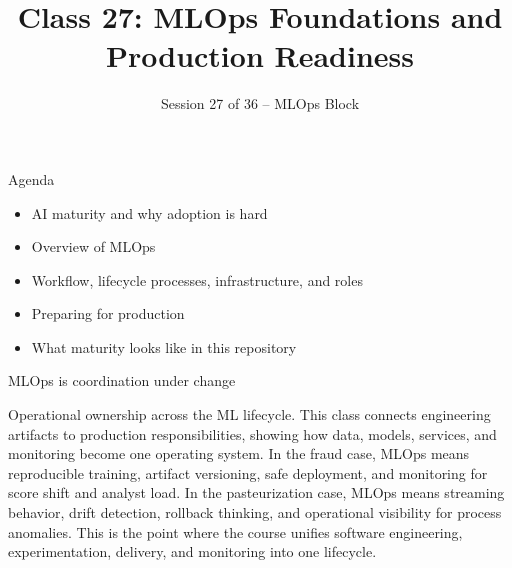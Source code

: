 

\title{Class 27: MLOps Foundations and Production Readiness}
\subtitle{Session 27 of 36 -- MLOps Block}
\author{\coursename}
\date{}



\frame{\titlepage \coursefooter}

\begin{frame}{Agenda}
\begin{itemize}
\item AI maturity and why adoption is hard
\item Overview of MLOps
\item Workflow, lifecycle processes, infrastructure, and roles
\item Preparing for production
\item What maturity looks like in this repository
\end{itemize}
\coursefooter
\end{frame}

\begin{frame}{MLOps is coordination under change}
\coursefooter
\end{frame}

\coursecontextframe
{Operational ownership across the ML lifecycle.}
{This class connects engineering artifacts to production responsibilities, showing how data, models, services, and monitoring become one operating system.}
{In the fraud case, MLOps means reproducible training, artifact versioning, safe deployment, and monitoring for score shift and analyst load.}
{In the pasteurization case, MLOps means streaming behavior, drift detection, rollback thinking, and operational visibility for process anomalies.}
{This is the point where the course unifies software engineering, experimentation, delivery, and monitoring into one lifecycle.}

